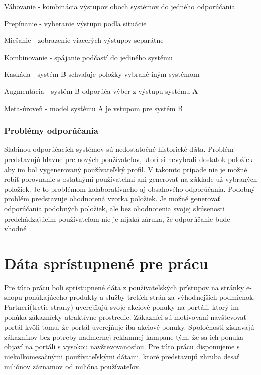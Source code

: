 \begin{my_itemize}
	\item{Váhovanie} - kombinácia výstupov oboch systémov do jedného odporúčania
	\item{Prepínanie} - vyberanie výstupu podľa situácie
	\item{Miešanie} - zobrazenie viacerých výstupov separátne
	\item{Kombinovanie} - spájanie podčastí do jediného systému
	\item{Kaskáda} - systém B schvaľuje položky vybrané iným systémom
	\item{Augmentácia} - systém B odporúča výber z výstupu systému A
	\item{Meta-úroveň} - model systému A je vstupom pre systém B
\end{my_itemize}

\subsection{Problémy odporúčania}
\label{recommender_problems}

Slabinou odporúčacích systémov sú nedostatočné historické dáta. Problém predstavujú hlavne pre nových používateľov, ktorí si nevybrali dostatok položiek aby im bol vygenerovaný používateľský profil. V takomto prípade nie je možné robiť porovnanie s ostatnými používateľmi ani generovať na základe už vybraných položiek. Je to problémom kolaboratívneho aj obsahového odporúčania. Podobný problém predstavuje ohodnotená vzorka položiek. Je možné generovať odporúčania podobných položiek, ale bez ohodnotenia svojej skúsenosti predchádzajúcim používateľom nie je nijaká záruka, že odporúčanie bude vhodné~\cite{adomavicius2005toward}.

\chapter{Dáta sprístupnené pre prácu}
\label{analyza_data}

Pre túto prácu boli sprístupnené dáta z používateľských prístupov na stránky e-shopu ponúkajúceho produkty a služby tretích strán za výhodnejších podmienok. Partneri(tretie strany) uverejňujú svoje akciové ponuky na portáli, ktorý im ponúka zákaznícky atraktívne prostredie. Zákazníci sú motivovaní navštevovať portál kvôli tomu, že portál uverejňuje iba akciové ponuky. Spoločnosti získavajú zákazníkov bez potreby nadmernej reklamnej kampane tým, že sa ich ponuka objaví na portáli s vysokou navštevovanosťou. Pre túto prácu disponujeme s niekoľkomesačnými používateľskými dátami, ktoré predstavujú zhruba desať miliónov záznamov od milióna používateľov.


